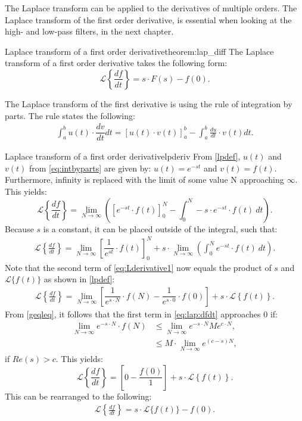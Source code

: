 \noindent The Laplace transform can be applied to the derivatives of multiple orders. The Laplace transform of the first order derivative, is essential when looking at the high- and low-pass filters, in the next chapter.
\\
\begin{theorem}{Laplace transform of a first order derivative}{theorem:lap_diff}
The Laplace transform of a first order derivative takes the following form: \cite[p.~332]{diffandcomplex}
$$\mathcal{L} \left\{\frac{df}{dt} \right\} = s \cdot F(s)-f(0).$$
\end{theorem}
\noindent The Laplace transform of the first derivative is using the rule of integration by parts. The rule states the following:
\begin{align}
\int_{a}^{b}{u(t) \cdot \dfrac{dv}{dt}dt}=\left[u(t) \cdot v(t) \right]_{a}^{b}-\int_{a}^{b} \frac{du}{dt}\cdot v(t) dt.
\label{eq:intbyparts}
\end{align}
\begin{prof}{Laplace transform of a first order derivative}{lpderiv}
From \cref{lpdef}, $u(t)$ and $v(t)$ from \eqref{eq:intbyparts} are given by: $u(t) = e^{-st}$ and $v(t) = f(t)$. Furthermore, infinity is replaced with the limit of some value N approaching $\infty$. This yields:
$$\mathcal{L} \left\{\frac{df}{dt} \right\}=\lim_{N \to \infty} \left(\left[e^{-st}\cdot f(t)\right]_{0}^{N}-\int_{0}^{N} -s\cdot e^{-st}\cdot f(t)\ dt \right).$$
Because $s$ is a constant, it can be placed outside of the integral, such that:
\begin{align}
\mathcal{L} \left\{\frac{df}{dt} \right\}=\lim_{N \to \infty} \left[\dfrac{1}{e^{st}}\cdot f(t)\right]_{0}^{N}+ s \cdot \lim_{N \to \infty} \left( \int_{0}^{N}e^{-st}\cdot f(t)\ dt \right).\label{eq:Lderivative1}
\end{align}
Note that the second term of \eqref{eq:Lderivative1} now equals the product of $s$ and $\mathcal{L}\{f(t)\}$ as shown in \cref{lpdef}:
\begin{align}
\mathcal{L} \left\{\frac{df}{dt} \right\} = \lim_{N \to \infty}\left[\dfrac{1}{e^{s\cdot N}}\cdot f(N)-\dfrac{1}{e^{s\cdot 0}}\cdot f(0)\right]+s\cdot \mathcal{L} \left\{f(t) \right\}. \label{eq:lap:dfdt}
\end{align}
From \cref{geqleq}, it follows that the first term in \eqref{eq:lap:dfdt} approaches $0$ if:
\begin{align*}
\lim_{N \to \infty} e^{-s\cdot N}\cdot f(N) &\leq \lim_{N \to \infty} e^{-s\cdot N} Me^{c\cdot N},\\
&\leq M \cdot \lim_{N \to \infty} e^{(c-s)N},
\end{align*}
if $Re(s) > c$. This yields:
$$\mathcal{L} \left\{\frac{df}{dt} \right\} = \left[0-\dfrac{f(0)}{1}\right]+s\cdot \mathcal{L} \left\{f(t) \right\}.$$
This can be rearranged to the following:
\begin{align*}
\mathcal{L} \left\{\frac{df}{dt} \right\} = s\cdot \mathcal{L}\{f(t)\}-f(0).
\end{align*}

\end{prof}
